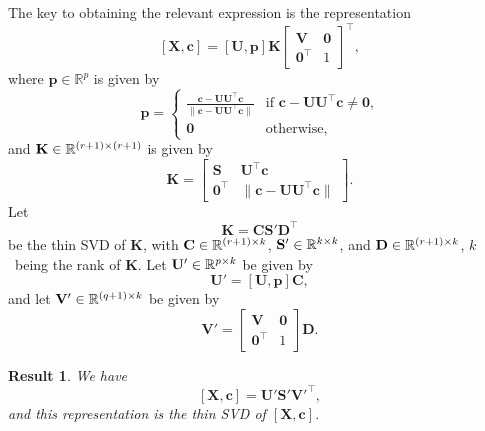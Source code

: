 \documentclass[11pt,a4paper]{article}
\theoremstyle{break}
\numberwithin{dummy}{section}
\theoremstyle{plain}
\newtheorem{result}{Result}[section]
\theoremstyle{plain}
\theoremstyle{plain}
\theoremstyle{plain}
\theoremstyle{plain}
\theoremstyle{MyNonumberplain}
\newcommand{\0}{\M{0}}
\newcommand{\M}[1]{\mathbf{#1}}
\newcommand{\R}{\mathbb{R}}
\newcommand{\T}{\top}
\newcommand{\ve}[1]{\mathbf{#1}}
\newcommand{\Mat}[2]{%
  \ifthenelse{\equal{#2}{1}}
  {\R^{#1}}
  {\R^{#1 \times #2}}
}
\begin{document}
The key to obtaining the relevant expression is the representation
\begin{equation}
  \label{eq:2}
  [\M{X}, \ve{c}] = [\M{U}, \ve{p}] \M{K}
  \begin{bmatrix}
    \M{V} & \0
    \\
    \0^\T & 1
  \end{bmatrix}^\T,
\end{equation}
where $\ve{p} \in \R^p$ is given by
\begin{displaymath}
  \ve{p} =
  \begin{cases}
    \frac{\ve{c} - \M{U} \M{U}^\T \ve{c}}{\| \ve{c} - \M{U} \M{U}^\T \ve{c}\|} & \text{if $\ve{c} - \M{U} \M{U}^\T \ve{c} \neq \0$,}
    \\
    \0 & \text{otherwise,}
  \end{cases}
\end{displaymath}
and $\M{K} \in \Mat{(r+1)}{(r+1)}$ is given by
\begin{displaymath}
  \M{K} =
  \begin{bmatrix}
    \M{S} & \M{U}^\T \ve{c} \\
    \0^\T & \| \ve{c} - \M{U} \M{U}^\T \ve{c} \|
  \end{bmatrix}.
\end{displaymath}
Let
\begin{equation}
  \label{eq:3}
  \M{K} = \M{C} \M{S}' \M{D}^\T
\end{equation}
be the thin SVD of $\M{K}$, with $\M{C} \in \Mat{(r+1)}{k}$, $\M{S}' \in \Mat{k}{k}$, and $\M{D} \in \Mat{(r+1)}{k}$, $k$~being the rank of $\M{K}$. Let $\M{U}' \in \Mat{p}{k}$ be given by
\begin{equation}
  \label{eq:4}
  \M{U}' = [\M{U}, \ve{p}] \M{C},
\end{equation}
and let $\M{V}' \in \Mat{(q+1)}{k}$ be given by
\begin{equation}
  \label{eq:5}
  \M{V}' =
  \begin{bmatrix}
    \M{V} & \0
    \\
    \0^\T & 1
  \end{bmatrix}
  \M{D}.
\end{equation}


\begin{result}
  \label{res:1}
  We have
  \begin{equation}
    \label{eq:6}
    [\M{X}, \ve{c}] = \M{U}' \M{S}' \M{V}'^\T,
  \end{equation}
  and this representation is the thin SVD of $[\M{X}, \ve{c}]$.
\end{result}
\end{document}
